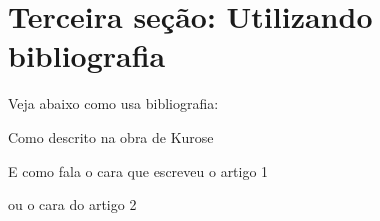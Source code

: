\documentclass[12pt,a4paper]{article}
\begin{document}
\newpage
\section{Terceira seção: Utilizando bibliografia}

Veja abaixo como usa bibliografia:


Como descrito na obra de Kurose \cite{kurose}

E como fala o cara que escreveu o artigo 1 \cite{artigo1}

ou o cara do artigo 2 \cite{artigo2}



\end{document}
